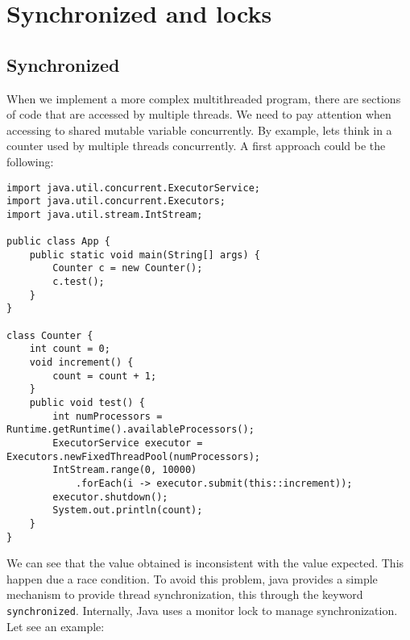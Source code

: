 \documentclass{latex/classes/myarticle}
\begin{document}
\section{Synchronized and locks}
\label{sec:orgf4bdfcf}


\subsection{Synchronized}
\label{sec:org50813be}

When we implement a more complex multithreaded program, there are sections
of code that are accessed by multiple threads. We need to pay attention when
accessing to shared mutable variable concurrently. By example, lets think in
a counter used by multiple threads concurrently. A first approach could be
the following:

\begin{lstlisting}
import java.util.concurrent.ExecutorService;
import java.util.concurrent.Executors;
import java.util.stream.IntStream;

public class App {
    public static void main(String[] args) {
        Counter c = new Counter();
        c.test();
    }
}

class Counter {
    int count = 0;
    void increment() {
        count = count + 1;
    }
    public void test() {
        int numProcessors = Runtime.getRuntime().availableProcessors();
        ExecutorService executor = Executors.newFixedThreadPool(numProcessors);
        IntStream.range(0, 10000)
            .forEach(i -> executor.submit(this::increment));
        executor.shutdown();
        System.out.println(count);
    }
}
\end{lstlisting}

We can see that the value obtained is inconsistent with the value
expected. This happen due a race condition.  To avoid this problem, java
provides a simple mechanism to provide thread synchronization, this through
the keyword \texttt{synchronized}. Internally, Java uses a monitor lock to manage
synchronization. Let see an example:
\end{document}
